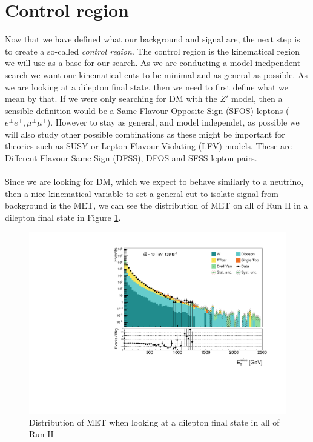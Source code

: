\documentclass[14pt, a4paper]{book}
\begin{document}
\section{Control region}
Now that we have defined what our background and signal are, the next step is to create a so-called \textit{control region}. The control region is the kinematical region we will use as a base for our search. As we are conducting a model inedpendent search we want 
our kinematical cuts to be minimal and as general as possible. As we are looking at a dilepton final state, then we need to first define what we mean by that. If we were only searching for DM with the $Z'$ model, then a sensible definition would be a 
Same Flavour Opposite Sign (SFOS) leptons ($e^\pm e^\mp, \mu^\pm\mu^\mp$). However to stay as general, and model independet, as possible we will also study other possible combinations as these might be important for theories such as SUSY or Lepton Flavour Violating 
(LFV) models. These are Different Flavour Same Sign (DFSS), DFOS and SFSS lepton pairs.\\
\\Since we are looking for DM, which we expect to behave similarly to a neutrino, then a nice kinematical variable to set a general cut to isolate signal from background is the MET, we can see the 
distribution of MET on all of Run II in a dilepton final state in Figure \ref{fig:uncut_met}.
\graphicspath{{../../../Plots/Data_Analysis/SRs/Uncut/}} 
\begin{figure}[!ht]
    \centering
    \includegraphics[width=1\textwidth]{met.pdf}
    \caption[MET dilepton final state Run II]{Distribution of MET when looking at a dilepton final state in all of Run II}\label{fig:uncut_met}
\end{figure}
\end{document}
